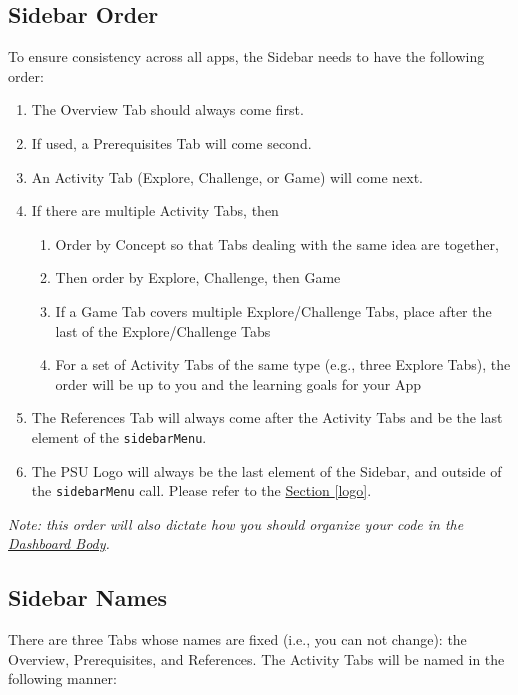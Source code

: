\documentclass[
]{book}
\providecommand{\tightlist}{%
  \setlength{\itemsep}{0pt}\setlength{\parskip}{0pt}}
\begin{document}
\hypertarget{sidebar-order-1}{%
\subsection{Sidebar Order}\label{sidebar-order-1}}

To ensure consistency across all apps, the Sidebar needs to have the following order:

\begin{enumerate}
\def\labelenumi{\arabic{enumi}.}
\tightlist
\item
  The Overview Tab should always come first.
\item
  If used, a Prerequisites Tab will come second.
\item
  An Activity Tab (Explore, Challenge, or Game) will come next.
\item
  If there are multiple Activity Tabs, then

  \begin{enumerate}
  \def\labelenumii{\alph{enumii}.}
  \tightlist
  \item
    Order by Concept so that Tabs dealing with the same idea are together,
  \item
    Then order by Explore, Challenge, then Game
  \item
    If a Game Tab covers multiple Explore/Challenge Tabs, place after the last of the Explore/Challenge Tabs
  \item
    For a set of Activity Tabs of the same type (e.g., three Explore Tabs), the order will be up to you and the learning goals for your App
  \end{enumerate}
\item
  The References Tab will always come after the Activity Tabs and be the last element of the \texttt{sidebarMenu}.
\item
  The PSU Logo will always be the last element of the Sidebar, and outside of the \texttt{sidebarMenu} call. Please refer to the \protect\hyperlink{logo}{Section \ref{logo}}.
\end{enumerate}

\emph{Note: this order will also dictate how you should organize your code in the \protect\hyperlink{body}{Dashboard Body}.}

\hypertarget{sidebar-names-1}{%
\subsection{Sidebar Names}\label{sidebar-names-1}}

There are three Tabs whose names are fixed (i.e., you can not change): the Overview, Prerequisites, and References. The Activity Tabs will be named in the following manner:
\end{document}
